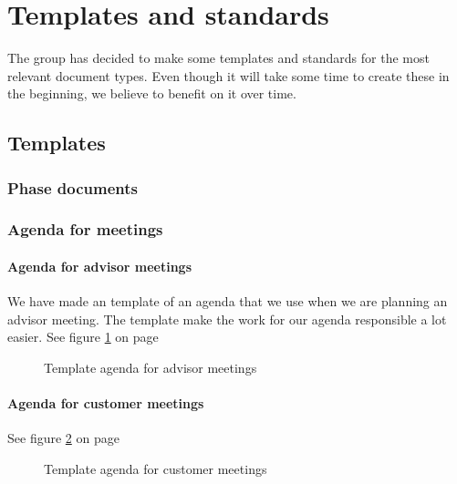

\section{Templates and standards}
The group has decided to make some templates and standards for the most relevant document types. Even though it will take some time to create these in the beginning, we believe to benefit on it over time.

\subsection{Templates}

\subsubsection{Phase documents}

\subsubsection{Agenda for meetings}

\paragraph{Agenda for advisor meetings}\hfill
\newline
We have made an template of an agenda that we use when we are planning an advisor meeting. The template make the work for our agenda responsible a lot easier.
See figure \ref{fig:agendaadvisor1} on page \pageref{fig:agendaadvisor}
\begin{figure}[hbt]
\begin{center}
\caption{Template agenda for advisor meetings}\label{fig:agendaadvisor1}
\end{center}
\end{figure}
\begin{figure}[hbt]
\begin{center}
\end{center}
\end{figure}

\paragraph{Agenda for customer meetings} \hfill
\newline
See figure \ref{fig:agendacustomer} on page \pageref{fig:agendacustomer}
\begin{figure}[hbt]
\begin{center}
\caption{Template agenda for customer meetings}\label{fig:agendacustomer}
\end{center}
\end{figure}

